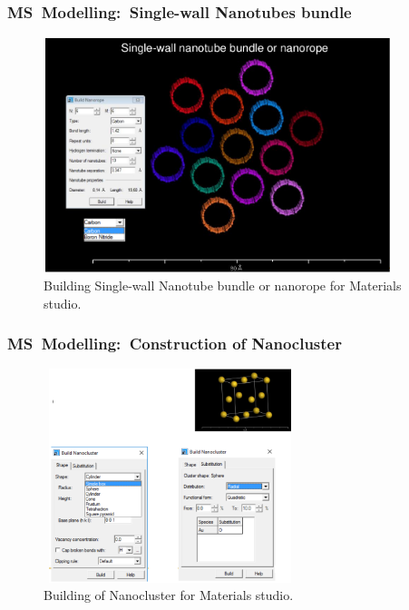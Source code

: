 \frame
{
	\frametitle{\textrm{MS~Modelling:~Single-wall Nanotubes bundle}}
\begin{figure}[h!]
\centering
\vspace*{-0.18in}
\includegraphics[height=2.70in,width=4.00in,viewport=0 0 947 646,clip]{Figures/MS-Building_Nanorope.png}
\caption{\tiny \textrm{Building Single-wall Nanotube bundle or nanorope for Materials studio.}}%
\label{MS-Building_Nanorope-bundle}
\end{figure}
}

\frame
{
	\frametitle{\textrm{MS~Modelling:~Construction of Nanocluster}}
\begin{figure}[h!]
\centering
\vspace*{-0.15in}
\includegraphics[height=2.45in,width=2.90in,viewport=0 0 814 716,clip]{Figures/MS-Building_Nanocluster.png}
\caption{\tiny \textrm{Building of Nanocluster for Materials studio.}}%
\label{MS-Building_Nanocluster}
\end{figure}
}

